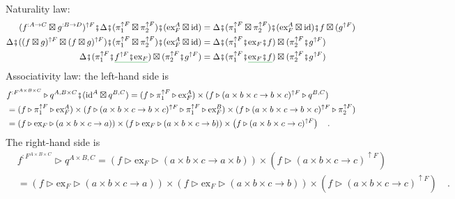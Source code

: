 Naturality law:
\begin{align*}
(f^{:A\rightarrow C}\boxtimes g^{:B\rightarrow D})^{\uparrow F}\bef\Delta\bef(\pi_{1}^{\uparrow F}\boxtimes\pi_{2}^{\uparrow F})\bef(\text{ex}_{F}^{A}\boxtimes\text{id}) & =\Delta\bef(\pi_{1}^{\uparrow F}\boxtimes\pi_{2}^{\uparrow F})\bef(\text{ex}_{F}^{A}\boxtimes\text{id})\bef f\boxtimes(g^{\uparrow F})\\
\Delta\bef((f\boxtimes g)^{\uparrow F}\boxtimes(f\boxtimes g)^{\uparrow F})\bef(\pi_{1}^{\uparrow F}\boxtimes\pi_{2}^{\uparrow F})\bef(\text{ex}_{F}^{A}\boxtimes\text{id}) & =\Delta\bef(\pi_{1}^{\uparrow F}\bef\text{ex}_{F}\bef f)\boxtimes(\pi_{2}^{\uparrow F}\bef g^{\uparrow F})\\
\Delta\bef(\pi_{1}^{\uparrow F}\bef\gunderline{f^{\uparrow F}\bef\text{ex}_{F}})\boxtimes(\pi_{2}^{\uparrow F}\bef g^{\uparrow F}) & =\Delta\bef(\pi_{1}^{\uparrow F}\bef\gunderline{\text{ex}_{F}\bef f})\boxtimes(\pi_{2}^{\uparrow F}\bef g^{\uparrow F})
\end{align*}
Associativity law: the left-hand side is
\begin{align*}
 & f^{:F^{A\times B\times C}}\triangleright q^{A,B\times C}\bef(\text{id}^{A}\boxtimes q^{B,C})=(f\triangleright\pi_{1}^{\uparrow F}\triangleright\text{ex}_{F}^{A})\times(f\triangleright(a\times b\times c\rightarrow b\times c)^{\uparrow F}\triangleright q^{B,C})\\
 & =(f\triangleright\pi_{1}^{\uparrow F}\triangleright\text{ex}_{F}^{A})\times(f\triangleright(a\times b\times c\rightarrow b\times c)^{\uparrow F}\triangleright\pi_{1}^{\uparrow F}\triangleright\text{ex}_{F}^{B})\times(f\triangleright(a\times b\times c\rightarrow b\times c)^{\uparrow F}\triangleright\pi_{2}^{\uparrow F})\\
 & =\left(f\triangleright\text{ex}_{F}\triangleright(a\times b\times c\rightarrow a)\right)\times\left(f\triangleright\text{ex}_{F}\triangleright(a\times b\times c\rightarrow b)\right)\times\left(f\triangleright(a\times b\times c\rightarrow c)^{\uparrow F}\right)\quad.
\end{align*}
The right-hand side is
\begin{align*}
 & f^{:F^{A\times B\times C}}\triangleright q^{A\times B,C}=(f\triangleright\text{ex}_{F}\triangleright(a\times b\times c\rightarrow a\times b))\times(f\triangleright(a\times b\times c\rightarrow c)^{\uparrow F})\\
 & =\left(f\triangleright\text{ex}_{F}\triangleright(a\times b\times c\rightarrow a)\right)\times\left(f\triangleright\text{ex}_{F}\triangleright(a\times b\times c\rightarrow b)\right)\times\left(f\triangleright(a\times b\times c\rightarrow c)^{\uparrow F}\right)\quad.
\end{align*}



